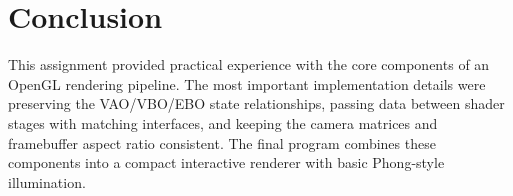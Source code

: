 \documentclass[acmtog]{acmart}
\begin{document}
  \section{Conclusion}
  This assignment provided practical experience with the core components of an
  OpenGL rendering pipeline.  The most important implementation details were
  preserving the VAO/VBO/EBO state relationships, passing data between shader
  stages with matching interfaces, and keeping the camera matrices and
  framebuffer aspect ratio consistent.  The final program combines these
  components into a compact interactive renderer with basic Phong-style
  illumination.
\end{document}
